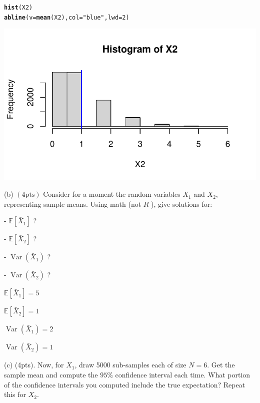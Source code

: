 \documentclass{article}\usepackage[]{graphicx}\usepackage[]{color}
\makeatletter
\def\maxwidth{ %
  \ifdim\Gin@nat@width>\linewidth
    \linewidth
  \else
    \Gin@nat@width
  \fi
}
\newcommand{\hlnum}[1]{\textcolor[rgb]{0.686,0.059,0.569}{#1}}%
\newcommand{\hlstr}[1]{\textcolor[rgb]{0.192,0.494,0.8}{#1}}%
\newcommand{\hlstd}[1]{\textcolor[rgb]{0.345,0.345,0.345}{#1}}%
\newcommand{\hlkwc}[1]{\textcolor[rgb]{0.333,0.667,0.333}{#1}}%
\newcommand{\hlkwd}[1]{\textcolor[rgb]{0.737,0.353,0.396}{\textbf{#1}}}%
\newenvironment{kframe}{%
 \def\at@end@of@kframe{}%
 \ifinner\ifhmode%
  \def\at@end@of@kframe{\end{minipage}}%
  \begin{minipage}{\columnwidth}%
 \fi\fi%
 \def\FrameCommand##1{\hskip\@totalleftmargin \hskip-\fboxsep
 \colorbox{shadecolor}{##1}\hskip-\fboxsep
     \hskip-\linewidth \hskip-\@totalleftmargin \hskip\columnwidth}%
 \MakeFramed {\advance\hsize-\width
   \@totalleftmargin\z@ \linewidth\hsize
   \@setminipage}}%
 {\par\unskip\endMakeFramed%
 \at@end@of@kframe}
\newenvironment{knitrout}{}{} %
\makeatother
\begin{document}
\begin{knitrout}
\color{fgcolor}\begin{kframe}
\begin{alltt}
\hlkwd{hist}\hlstd{(X2)}
\hlkwd{abline}\hlstd{(}\hlkwc{v} \hlstd{=} \hlkwd{mean}\hlstd{(X2),} \hlkwc{col} \hlstd{=} \hlstr{"blue"}\hlstd{,} \hlkwc{lwd} \hlstd{=} \hlnum{2}\hlstd{)}
\end{alltt}
\end{kframe}
\includegraphics[width=\maxwidth]{figure/unnamed-chunk-8-1} 
\end{knitrout}

\vspace*{0.5cm}

(b) $(4 \mathrm{pts})$ Consider for a moment the random variables $\bar{X}_{1}$ and $\bar{X}_{2}$, representing sample means. Using math (not $R$ ), give solutions for:

- $\mathbb{E}\left[\bar{X}_{1}\right]$ ?

- $\mathbb{E}\left[\bar{X}_{2}\right]$ ?

- $\operatorname{Var}\left(\bar{X}_{1}\right)$ ?

- $\operatorname{Var}\left(\bar{X}_{2}\right)$ ?

\vspace*{0.5cm}
$\mathbb{E}\left[\bar{X}_{1}\right] = 5$

$\mathbb{E}\left[\bar{X}_{2}\right] = 1$

$\operatorname{Var}\left(\bar{X}_{1}\right) = 2$ 

$\operatorname{Var}\left(\bar{X}_{2}\right) = 1$ 
\vspace*{0.5cm}

(c) (4pts). Now, for $X_{1}$, draw 5000 sub-samples each of size $N=6$. Get the sample mean and compute the $95 \%$ confidence interval each time. What portion of the confidence intervals you computed include the true expectation? Repeat this for $X_{2}$.
\end{document}
